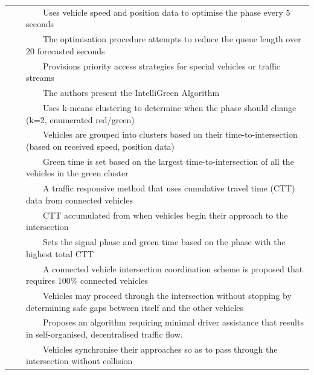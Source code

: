\documentclass[numbered]{trbunofficial}
\newcommand{\tabitem}{~~\llap{\textbullet}~~}
\newenvironment{ltable}
{\begin{landscape}\begin{table}}
		{\end{table}\end{landscape}}
\begin{document}
{\begin{ltable}[p]
{\begin{threeparttable}
\begin{tabular}{p{}p{0.01cm}@{}p{20cm}}
			\cite{priemer2009} &	& 
			\tabitem Uses vehicle speed and position data to optimise the phase every 5 seconds \\&&
			\tabitem The optimisation procedure attempts to reduce the queue length over 20 forecasted seconds \\&&
			\tabitem Provisions priority access strategies for special vehicles or traffic streams \\
			\midrule
			
			\cite{Datesh2011} &	& 
			\tabitem The authors present the IntelliGreen Algorithm \\&&
			\tabitem Uses k-means clustering to determine when the phase should change (k=2, enumerated red/green) \\&&
			\tabitem Vehicles are grouped into clusters based on their time-to-intersection (based on received speed, position data) \\&&
			\tabitem Green time is set based on the largest time-to-intersection of all the vehicles in the green cluster\\
			\midrule
			
			\cite{Lee2013} &	& 
			\tabitem A traffic responsive method that uses cumulative travel time (CTT) data from connected vehicles \\&&
			\tabitem CTT accumulated from when vehicles begin their approach to the intersection \\&&
			\tabitem Sets the signal phase and green time based on the phase with the highest total CTT \\
			\midrule
			
			\cite{Lee2012} &	& 
			\tabitem A connected vehicle intersection coordination scheme is proposed that requires 100\% connected vehicles \\&&
			\tabitem Vehicles may proceed through the intersection without stopping by determining safe gaps between itself and the other vehicles \\
			\midrule
			
			\cite{yang2016} &	& 
			\tabitem Proposes an algorithm requiring minimal driver assistance that results in self-organised, decentralised traffic flow. \\&&
			\tabitem Vehicles synchronise their approaches so as to pass through the intersection without collision \\
			\bottomrule
		\end{tabular}
		\begin{tablenotes}[flushleft]
			\item \emph{}
		\end{tablenotes}
	\end{threeparttable}}\label{tab:itsctrl}
\end{ltable}}
				
\end{document}
